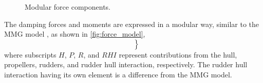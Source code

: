 \begin{figure}[h!]
    \centering
    
    \caption{Modular force components.}
    \label{fig:force_model}
\end{figure}

The damping forces and moments are expressed in a modular way, similar to the MMG model \citep{yasukawaIntroductionMMGStandard2015}, as shown in \autoref{fig:force_model},
\begin{equation}
    \label{eq:X_D}
    \left.\begin{aligned}
     \\
     \\
    
    \end{aligned}\right\}
\end{equation}
%
%     
%     
where subscripts $H$, $P$, $R$, and $RHI$ represent contributions from the hull, propellers, rudders, and rudder hull interaction, respectively. The rudder hull interaction having its own element is a difference from the MMG model.